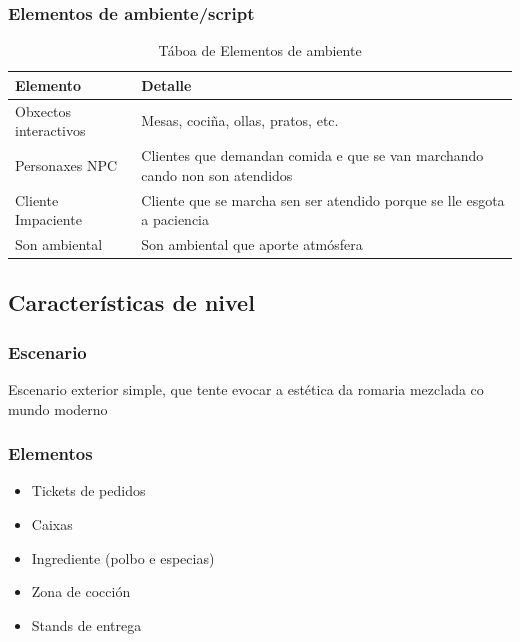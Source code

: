 \documentclass{report}  %
\begin{document}
\clearpage

\subsubsection{Elementos de ambiente/script}
\begin{table}[h]
    \centering
    \renewcommand{\arraystretch}{1.3} %
    \setlength{\tabcolsep}{10pt} %
    \label{tab:elementos}
    \begin{tabular}{|p{4cm}|p{9cm}|}
        \hline
        \rowcolor{octopus} %
        \textbf{Elemento}  & \textbf{Detalle} \\
        \hline
        Obxectos interactivos & Mesas, cociña, ollas, pratos, etc. \\
        \hline
        Personaxes NPC & Clientes que demandan comida e que se van marchando cando non son atendidos \\
        \hline
        Cliente Impaciente & Cliente que se marcha sen ser atendido porque se lle esgota a paciencia \\
        \hline
        Son ambiental & Son ambiental que aporte atmósfera \\
        \hline
    \end{tabular}
    \caption{Táboa de Elementos de ambiente}
\end{table}



\subsection{Características de nivel}

\subsubsection{Escenario}
Escenario exterior simple, que tente evocar a estética da romaria mezclada co mundo moderno
\subsubsection{Elementos}
\begin{itemize}
    \item Tickets de pedidos
    \item Caixas
    \item Ingrediente (polbo e especias)
    \item Zona de cocción
    \item Stands de entrega
\end{itemize}
\end{document}
